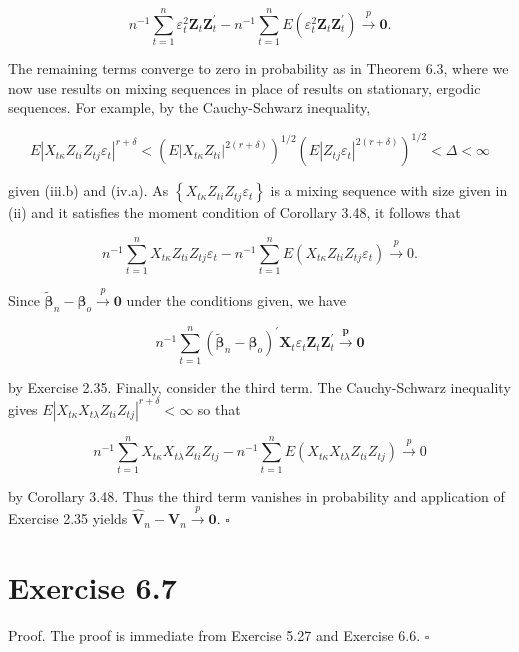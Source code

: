 \documentclass[10pt]{article}
\begin{document}
$$
n^{-1} \sum_{t=1}^{n} \varepsilon_{t}^{2} \mathbf{Z}_{t} \mathbf{Z}_{t}^{\prime}-n^{-1} \sum_{t=1}^{n} E\left(\varepsilon_{t}^{2} \mathbf{Z}_{t} \mathbf{Z}_{t}^{\prime}\right) \xrightarrow{p} \mathbf{0} .
$$

The remaining terms converge to zero in probability as in Theorem 6.3, where we now use results on mixing sequences in place of results on stationary, ergodic sequences. For example, by the Cauchy-Schwarz inequality,

$$
E\left|X_{t \kappa} Z_{t i} Z_{t j} \varepsilon_{t}\right|^{r+\delta}<\left(E\left|X_{t \kappa} Z_{t i}\right|^{2(r+\delta)}\right)^{1 / 2}\left(E\left|Z_{t j} \varepsilon_{t}\right|^{2(r+\delta)}\right)^{1 / 2}<\Delta<\infty
$$

given (iii.b) and (iv.a). As $\left\{X_{t \kappa} Z_{t i} Z_{t j} \varepsilon_{t}\right\}$ is a mixing sequence with size given in (ii) and it satisfies the moment condition of Corollary 3.48, it follows that

$$
n^{-1} \sum_{t=1}^{n} X_{t \kappa} Z_{t i} Z_{t j} \varepsilon_{t}-n^{-1} \sum_{t=1}^{n} E\left(X_{t \kappa} Z_{t i} Z_{t j} \varepsilon_{t}\right) \xrightarrow{p} 0 .
$$

Since $\tilde{\boldsymbol{\beta}}_{n}-\boldsymbol{\beta}_{o} \xrightarrow{p} \mathbf{0}$ under the conditions given, we have

$$
n^{-1} \sum_{t=1}^{n}\left(\tilde{\boldsymbol{\beta}}_{n}-\boldsymbol{\beta}_{o}\right)^{\prime} \mathbf{X}_{t} \varepsilon_{t} \mathbf{Z}_{t} \mathbf{Z}_{t}^{\prime} \xrightarrow{\boldsymbol{p}} \mathbf{0}
$$

by Exercise 2.35. Finally, consider the third term. The Cauchy-Schwarz inequality gives $E\left|X_{t \kappa} X_{t \lambda} Z_{t i} Z_{t j}\right|^{r+\delta}<\infty$ so that

$$
n^{-1} \sum_{t=1}^{n} X_{t \kappa} X_{t \lambda} Z_{t i} Z_{t j}-n^{-1} \sum_{t=1}^{n} E\left(X_{t \kappa} X_{t \lambda} Z_{t i} Z_{t j}\right) \xrightarrow{p} 0
$$

by Corollary 3.48. Thus the third term vanishes in probability and application of Exercise 2.35 yields $\hat{\mathbf{V}}_{n}-\mathbf{V}_{n} \xrightarrow{p} \mathbf{0}$. \(\square\)

\section*{Exercise 6.7}
Proof. The proof is immediate from Exercise 5.27 and Exercise 6.6. \(\square\)
\end{document}
